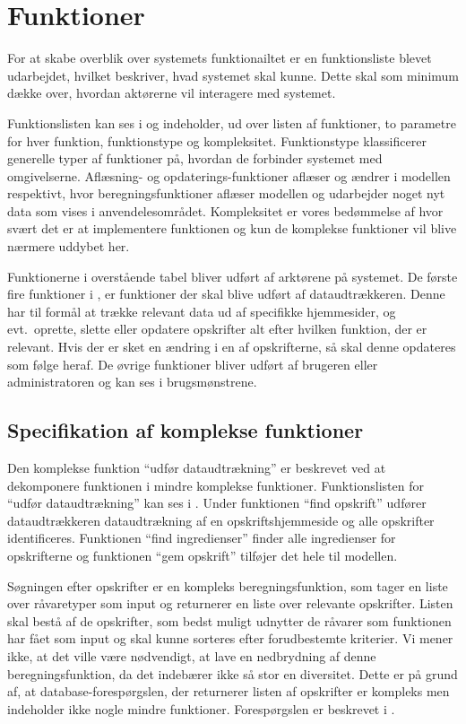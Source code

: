 \section{Funktioner}
\label{sec:funktioner}

For at skabe overblik over systemets funktionailtet er en funktionsliste  blevet udarbejdet, hvilket beskriver, hvad systemet skal kunne. Dette skal som minimum dække over, hvordan aktørerne vil interagere med systemet.

Funktionslisten kan ses i  og indeholder, ud over listen af funktioner, to parametre for hver funktion, funktionstype og kompleksitet. Funktionstype klassificerer generelle typer af funktioner på, hvordan de forbinder systemet med omgivelserne. Aflæsning- og opdaterings-funktioner aflæser og ændrer i modellen respektivt, hvor beregningsfunktioner aflæser modellen og udarbejder noget nyt data som vises i anvendelesområdet. Kompleksitet er vores bedømmelse af hvor svært det er at implementere funktionen og kun de komplekse funktioner vil blive nærmere uddybet her.



Funktionerne i overstående tabel bliver udført af arktørene på systemet. De første fire funktioner i , er funktioner der skal blive udført af dataudtrækkeren. Denne har til formål at trække relevant data ud af specifikke hjemmesider, og evt.\ oprette, slette eller opdatere opskrifter alt efter hvilken funktion, der er relevant. Hvis der \fx er sket en ændring i en af opskrifterne, så skal denne opdateres som følge heraf. De øvrige funktioner bliver udført af brugeren eller administratoren og kan ses i brugsmønstrene.

\subsection{Specifikation af komplekse funktioner}
Den komplekse funktion ``udfør dataudtrækning'' er beskrevet ved at dekomponere funktionen i mindre komplekse funktioner. Funktionslisten for ``udfør dataudtrækning'' kan ses i . Under funktionen ``find opskrift'' udfører dataudtrækkeren dataudtrækning af en opskriftshjemmeside og alle opskrifter identificeres. Funktionen ``find ingredienser'' finder alle ingredienser for opskrifterne og funktionen ``gem opskrift'' tilføjer det hele til modellen.



Søgningen efter opskrifter er en kompleks beregningsfunktion, som tager en liste over råvaretyper som input og returnerer en liste over relevante opskrifter. Listen skal bestå af de opskrifter, som bedst muligt udnytter de råvarer som funktionen har fået som input og skal kunne sorteres efter forudbestemte kriterier. Vi mener ikke, at det ville være nødvendigt, at lave en nedbrydning af denne beregningsfunktion, da det indebærer ikke så stor en diversitet. Dette er på grund af, at database-forespørgslen, der returnerer listen af opskrifter er kompleks men indeholder ikke nogle mindre funktioner. Forespørgslen er beskrevet i .
